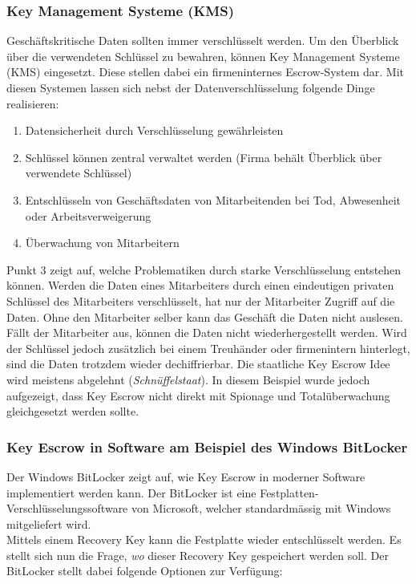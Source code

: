 	\subsubsection{Key Management Systeme (KMS)}	
Geschäftskritische Daten sollten immer verschlüsselt werden. Um den Überblick über die verwendeten Schlüssel zu bewahren, können Key Management Systeme (KMS) eingesetzt. Diese stellen dabei ein firmeninternes Escrow-System dar.
Mit diesen Systemen lassen sich nebst der Datenverschlüsselung folgende Dinge realisieren:
\begin{enumerate}
	\item Datensicherheit durch Verschlüsselung gewährleisten
	\item Schlüssel können zentral verwaltet werden (Firma behält Überblick über verwendete Schlüssel)
	\item Entschlüsseln von Geschäftsdaten von Mitarbeitenden bei Tod, Abwesenheit oder Arbeitsverweigerung
  	\item Überwachung von Mitarbeitern
\end{enumerate}
Punkt 3 zeigt auf, welche Problematiken durch starke Verschlüsselung entstehen können. Werden die Daten eines Mitarbeiters durch einen eindeutigen privaten Schlüssel des Mitarbeiters verschlüsselt, hat nur der Mitarbeiter Zugriff auf die Daten. Ohne den Mitarbeiter selber kann das Geschäft die Daten nicht auslesen. Fällt der Mitarbeiter aus, können die Daten nicht wiederhergestellt werden. Wird der Schlüssel jedoch zusätzlich bei einem Treuhänder oder firmenintern hinterlegt, sind die Daten trotzdem wieder dechiffrierbar.
Die staatliche Key Escrow Idee wird meistens abgelehnt (\textit{Schnüffelstaat}). In diesem Beispiel wurde jedoch aufgezeigt, dass Key Escrow nicht direkt mit Spionage und Totalüberwachung gleichgesetzt werden sollte.

	\subsubsection{Key Escrow in Software am Beispiel des Windows BitLocker}
Der Windows BitLocker zeigt auf, wie Key Escrow in moderner Software implementiert werden kann. Der BitLocker ist eine Festplatten-Verschlüsselungssoftware von Microsoft, welcher standardmässig mit Windows mitgeliefert wird. \\
Mittels einem Recovery Key kann die Festplatte wieder entschlüsselt werden. Es stellt sich nun die Frage, \textit{wo} dieser Recovery Key gespeichert werden soll. Der BitLocker stellt dabei folgende Optionen zur Verfügung:

